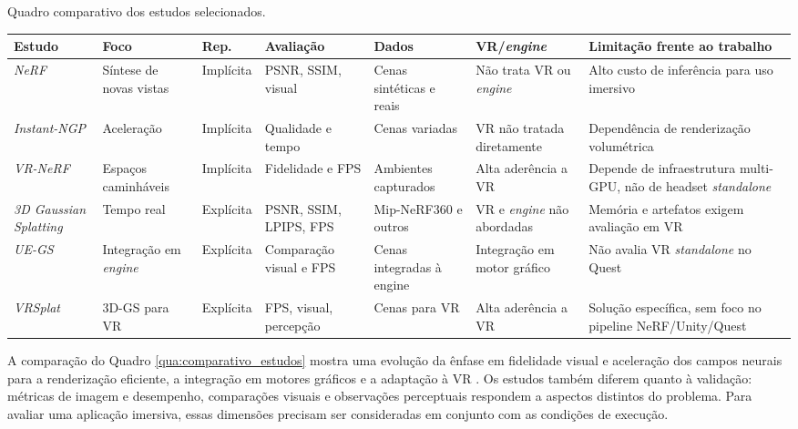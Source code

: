 \begin{quadro}[H]
\centering
\scriptsize
\caption{Quadro comparativo dos estudos selecionados.}
\label{qua:comparativo_estudos}
\renewcommand{\arraystretch}{1.2}
\setlength{\tabcolsep}{2pt}
\begin{tabularx}{\textwidth}{|p{1.85cm}|p{1.65cm}|p{1.55cm}|p{2.05cm}|p{1.95cm}|p{1.75cm}|X|}
\hline
\textbf{Estudo} & \textbf{Foco} & \textbf{Rep.} & \textbf{Avaliação} & \textbf{Dados} & \textbf{VR/\textit{engine}} & \textbf{Limitação frente ao trabalho} \\
\hline

\textit{NeRF} \cite{mildenhall2020}
& Síntese de novas vistas
& Implícita
& PSNR, SSIM, visual
& Cenas sintéticas e reais
& Não trata VR ou \textit{engine}
& Alto custo de inferência para uso imersivo \\
\hline

\textit{Instant-NGP} \cite{muller2022}
& Aceleração
& Implícita
& Qualidade e tempo
& Cenas variadas
& VR não tratada diretamente
& Dependência de renderização volumétrica \\
\hline

\textit{VR-NeRF} \cite{xu2023}
& Espaços caminháveis
& Implícita
& Fidelidade e FPS
& Ambientes capturados
& Alta aderência a VR
& Depende de infraestrutura multi-GPU, não de headset \textit{standalone} \\
\hline

\textit{3D Gaussian Splatting} \cite{kerbl2023}
& Tempo real
& Explícita
& PSNR, SSIM, LPIPS, FPS
& Mip-NeRF360 e outros
& VR e \textit{engine} não abordadas
& Memória e artefatos exigem avaliação em VR \\
\hline

\textit{UE-GS} \cite{jin2024}
& Integração em \textit{engine}
& Explícita
& Comparação visual e FPS
& Cenas integradas à engine
& Integração em motor gráfico
& Não avalia VR \textit{standalone} no Quest \\
\hline

\textit{VRSplat} \cite{tu2025}
& 3D-GS para VR
& Explícita
& FPS, visual, percepção
& Cenas para VR
& Alta aderência a VR
& Solução específica, sem foco no pipeline NeRF/Unity/Quest \\
\hline

\end{tabularx}
\end{quadro}

A comparação do Quadro \ref{qua:comparativo_estudos} mostra uma evolução da ênfase em fidelidade visual e aceleração dos campos neurais para a renderização eficiente, a integração em motores gráficos e a adaptação à VR \cite{mildenhall2020,muller2022,xu2023,kerbl2023,jin2024,tu2025}. Os estudos também diferem quanto à validação: métricas de imagem e desempenho, comparações visuais e observações perceptuais respondem a aspectos distintos do problema. Para avaliar uma aplicação imersiva, essas dimensões precisam ser consideradas em conjunto com as condições de execução.

